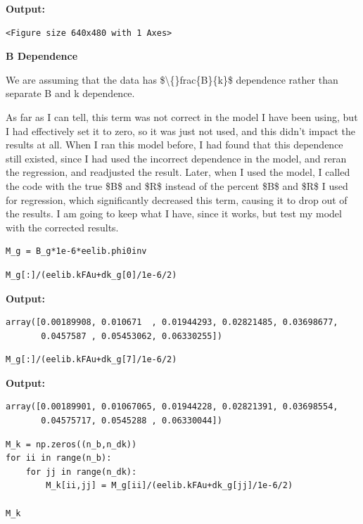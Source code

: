 \documentclass{article}
\begin{document}
\textbf{Output:}\begin{verbatim}
<Figure size 640x480 with 1 Axes>
\end{verbatim}

\textbf{B Dependence}

We are assuming that the data has \$\textbackslash\{\}frac\{B\}\{k\}\$ dependence rather than separate B and k dependence. 

As far as I can tell, this term was not correct in the model I have been using, but I had effectively set it to zero, so it was just not used, and this didn't impact the results at all. When I ran this model before, I had found that this dependence still existed, since I had used the incorrect dependence in the model, and reran the regression, and readjusted the result. Later, when I used the model, I called the code with the true \$B\$ and \$R\$ instead of the percent \$B\$ and \$R\$ I used for regression, which significantly decreased this term, causing it to drop out of the results. I am going to keep what I have, since it works, but test my model with the corrected results.

\begin{lstlisting}
M_g = B_g*1e-6*eelib.phi0inv\end{lstlisting}

\begin{lstlisting}
M_g[:]/(eelib.kFAu+dk_g[0]/1e-6/2)\end{lstlisting}

\textbf{Output:}\begin{verbatim}
array([0.00189908, 0.010671  , 0.01944293, 0.02821485, 0.03698677,
       0.0457587 , 0.05453062, 0.06330255])
\end{verbatim}

\begin{lstlisting}
M_g[:]/(eelib.kFAu+dk_g[7]/1e-6/2)\end{lstlisting}

\textbf{Output:}\begin{verbatim}
array([0.00189901, 0.01067065, 0.01944228, 0.02821391, 0.03698554,
       0.04575717, 0.0545288 , 0.06330044])
\end{verbatim}

\begin{lstlisting}
M_k = np.zeros((n_b,n_dk))
for ii in range(n_b):
    for jj in range(n_dk):
        M_k[ii,jj] = M_g[ii]/(eelib.kFAu+dk_g[jj]/1e-6/2)

M_k\end{lstlisting}
\end{document}
